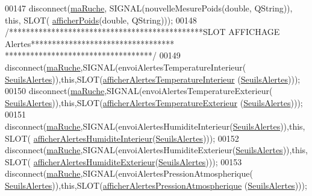 \begin{DoxyCode}
00147     disconnect(\hyperlink{class_ruche_ihm_a43a6b1fa31f4fba58d919daae3707b38}{maRuche}, SIGNAL(nouvelleMesurePoids(\textcolor{keywordtype}{double}, QString)), \textcolor{keyword}{this}, SLOT(
      \hyperlink{class_ruche_ihm_a840ab51f951632e630f92e6c0b5ecc4d}{afficherPoids}(\textcolor{keywordtype}{double}, QString)));
00148     \textcolor{comment}{/**********************************************SLOT AFFICHAGE Alertes**********************************
      ***********************************/}
00149     disconnect(\hyperlink{class_ruche_ihm_a43a6b1fa31f4fba58d919daae3707b38}{maRuche},SIGNAL(envoiAlertesTemperatureInterieur(
      \hyperlink{parametres_8h_aaa6de8207c94675264c90b10b613368d}{SeuilsAlertes})),\textcolor{keyword}{this},SLOT(\hyperlink{class_ruche_ihm_af4848134f2bc17d9772f2408a068e9d8}{afficherAlertesTemperatureInterieur}
      (\hyperlink{parametres_8h_aaa6de8207c94675264c90b10b613368d}{SeuilsAlertes})));
00150     disconnect(\hyperlink{class_ruche_ihm_a43a6b1fa31f4fba58d919daae3707b38}{maRuche},SIGNAL(envoiAlertesTemperatureExterieur(
      \hyperlink{parametres_8h_aaa6de8207c94675264c90b10b613368d}{SeuilsAlertes})),\textcolor{keyword}{this},SLOT(\hyperlink{class_ruche_ihm_ada4be5a54f7fa57de6190d44e3cfcb82}{afficherAlertesTemperatureExterieur}
      (\hyperlink{parametres_8h_aaa6de8207c94675264c90b10b613368d}{SeuilsAlertes})));
00151     disconnect(\hyperlink{class_ruche_ihm_a43a6b1fa31f4fba58d919daae3707b38}{maRuche},SIGNAL(envoiAlertesHumiditeInterieur(\hyperlink{parametres_8h_aaa6de8207c94675264c90b10b613368d}{SeuilsAlertes})),\textcolor{keyword}{this},SLOT(
      \hyperlink{class_ruche_ihm_abfe91b271dde97048bb218b04c9e167b}{afficherAlertesHumiditeInterieur}(\hyperlink{parametres_8h_aaa6de8207c94675264c90b10b613368d}{SeuilsAlertes})));
00152     disconnect(\hyperlink{class_ruche_ihm_a43a6b1fa31f4fba58d919daae3707b38}{maRuche},SIGNAL(envoiAlertesHumiditeExterieur(\hyperlink{parametres_8h_aaa6de8207c94675264c90b10b613368d}{SeuilsAlertes})),\textcolor{keyword}{this},SLOT(
      \hyperlink{class_ruche_ihm_a76b73e39e55443fc7b9bb773eac3321f}{afficherAlertesHumiditeExterieur}(\hyperlink{parametres_8h_aaa6de8207c94675264c90b10b613368d}{SeuilsAlertes})));
00153     disconnect(\hyperlink{class_ruche_ihm_a43a6b1fa31f4fba58d919daae3707b38}{maRuche},SIGNAL(envoiAlertesPressionAtmospherique(
      \hyperlink{parametres_8h_aaa6de8207c94675264c90b10b613368d}{SeuilsAlertes})),\textcolor{keyword}{this},SLOT(\hyperlink{class_ruche_ihm_abea08b19d4f52f6767a8618bbc25d956}{afficherAlertesPressionAtmospherique}
      (\hyperlink{parametres_8h_aaa6de8207c94675264c90b10b613368d}{SeuilsAlertes})));

\end{DoxyCode}

